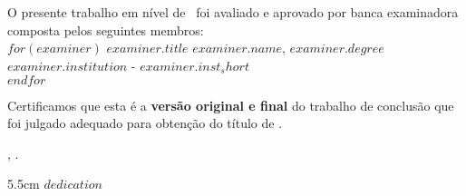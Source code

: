 \documentclass[
	12pt,				%
	oneside,			%
	a4paper,			%
	chapter=TITLE,		%
	section=TITLE,		%
	english,			%
	brazil				%
	]{abntex2}
\begin{document}
\begin{folhadeaprovacao}
	\OnehalfSpacing
	\centering
	\imprimirautor\\%
	\vspace*{10pt}		
	\textbf{\imprimirtitulo}%
	\ifnotempty{\imprimirsubtitulo}{:~\imprimirsubtitulo}\\%
	\vspace*{\baselineskip}
	O presente trabalho em nível de \imprimirnivel~foi avaliado e aprovado por banca examinadora composta pelos seguintes membros:\\
	\vspace*{\baselineskip}
  $for(examiner)$
  $examiner.title$ $examiner.name$, $examiner.degree$\\
  $examiner.institution$ - $examiner.inst_short$\\
  \vspace*{\baselineskip}
  $endfor$
  
	\vspace*{2\baselineskip}
	\begin{minipage}{\textwidth}
		Certificamos que esta é a \textbf{versão original e final} do trabalho de conclusão que foi julgado adequado para obtenção do título de \imprimirformacao.\\
	\end{minipage}
	\vspace*{\fill}
	\vspace*{\fill}
	\assinatura{\OnehalfSpacing\imprimirorientador \\ \imprimirorientadorRotulo}
	\vspace*{\fill}
	\imprimirlocal, \imprimirano.
\end{folhadeaprovacao}

\begin{dedicatoria}
	\vspace*{\fill}
	\noindent
	\begin{adjustwidth*}{}{5.5cm} 
		\raggedleft       
		$dedication$
	\end{adjustwidth*}
\end{dedicatoria}
\end{document}
